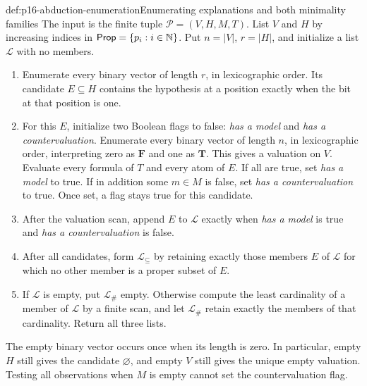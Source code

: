 \begin{hbmethod}{def:p16-abduction-enumeration}{Enumerating explanations and both minimality families}
The input is the finite tuple \(\mathcal P=(V,H,M,T)\). List \(V\)
and \(H\) by increasing indices in \(\mathsf{Prop}=\{p_i:i\in\mathbb{N}\}\).
Put \(n=|V|\), \(r=|H|\), and initialize a list \(\mathcal L\)
with no members.
\begin{enumerate}
\item Enumerate every binary vector of length \(r\), in lexicographic
      order. Its candidate \(E\subseteq H\) contains the hypothesis
      at a position exactly when the bit at that position is one.
\item For this \(E\), initialize two Boolean flags to false:
      \emph{has a model} and \emph{has a countervaluation}. Enumerate
      every binary vector of length \(n\), in lexicographic order,
      interpreting zero as
      \(\mathbf{F}\) and one as \(\mathbf{T}\). This gives a valuation on
      \(V\). Evaluate every formula of \(T\) and every atom of \(E\).
      If all are true, set \emph{has a model} to true. If in addition some
      \(m\in M\) is false, set \emph{has a countervaluation} to true.
      Once set, a flag stays true for this candidate.
\item After the valuation scan, append \(E\) to \(\mathcal L\)
      exactly when \emph{has a model} is true and
      \emph{has a countervaluation} is false.
\item After all candidates, form \(\mathcal L_{\subseteq}\) by
      retaining exactly those members \(E\) of \(\mathcal L\) for
      which no other member is a proper subset of \(E\).
\item If \(\mathcal L\) is empty, put \(\mathcal L_{\#}\) empty.
      Otherwise compute the least cardinality of a member of \(\mathcal L\)
      by a finite scan, and let \(\mathcal L_{\#}\) retain exactly
      the members of that cardinality. Return all three lists.
\end{enumerate}
The empty binary vector occurs once when its length is zero. In particular,
empty \(H\) still gives the candidate \(\varnothing\), and empty
\(V\) still gives the unique empty valuation. Testing all observations
when \(M\) is empty cannot set the countervaluation flag.
\end{hbmethod}

